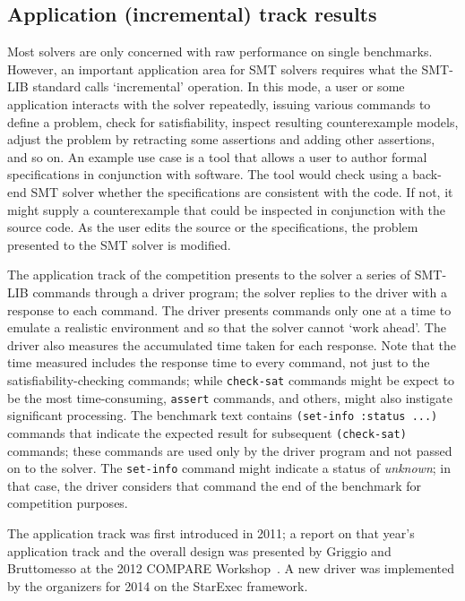 \documentclass[twoside,11pt]{article}
\begin{document}
\subsection{Application (incremental) track results}
\label{sec:application-results}

Most solvers are only concerned with raw performance on single benchmarks. However, an important application area for SMT solvers requires what the SMT-LIB standard calls `incremental' operation.
In this mode, a user or some application interacts with the solver repeatedly, issuing various commands to define a problem, check for satisfiability, inspect resulting counterexample models, adjust the problem by retracting some assertions and adding other assertions, and so on. An example use case is a tool that allows a user to author formal specifications in conjunction with software. The tool would
check using a back-end SMT solver whether the specifications are consistent with the code. If not, it might
supply a counterexample that could be inspected in conjunction with the source code. As the user edits the source or the specifications, the problem presented to the SMT solver is modified. 

The application track of the competition presents to the solver a series of SMT-LIB commands through a driver program; the solver replies to the driver with a 
response to each command. The driver presents commands only one at a time to emulate a realistic environment and so that the solver cannot `work ahead'. The driver also measures the accumulated time taken for each response. Note that the time measured includes the response time to every command, not just to the satisfiability-checking commands; while \texttt{check-sat} commands might be expect to be the most time-consuming, \texttt{assert} commands, and others, might also instigate significant processing. The benchmark text contains \texttt{(set-info :status ...)} commands that 
indicate the expected result for subsequent \texttt{(check-sat)} commands; these commands are used only by the driver program and not passed on to the solver. The \texttt{set-info} command might indicate a status of \emph{unknown}; in that case, the driver
considers that command the end of the benchmark for competition purposes.

The application track was first introduced in 2011; a report
on that year's application track and the overall design was presented by Griggio and Bruttomesso at the 
2012 COMPARE Workshop~\cite{ag+rb+12}. A new driver was implemented by the organizers for 2014 on the StarExec framework.
\end{document}
